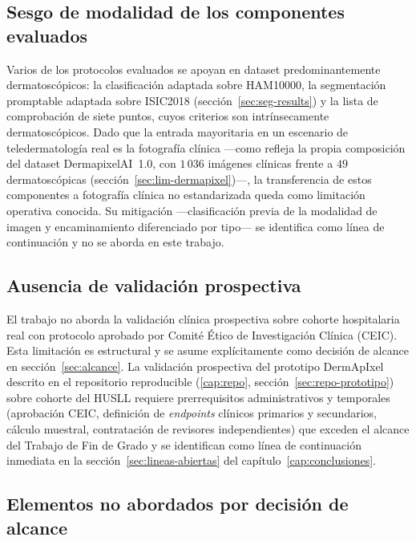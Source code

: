\subsection{Sesgo de modalidad de los componentes evaluados}
\label{sec:lim-modalidad-sistema}

Varios de los protocolos evaluados se apoyan en dataset
predominantemente dermatoscópicos: la clasificación adaptada sobre
HAM10000, la segmentación promptable adaptada sobre ISIC2018
(sección~\ref{sec:seg-results}) y la lista de comprobación de
siete puntos, cuyos criterios son intrínsecamente dermatoscópicos.
Dado que la entrada mayoritaria en un escenario de teledermatología
real es la fotografía clínica ---como refleja la propia composición
del dataset DermapixelAI~1.0, con $1\,036$ imágenes clínicas frente a
$49$ dermatoscópicas (sección~\ref{sec:lim-dermapixel})---, la
transferencia de estos componentes a fotografía clínica no
estandarizada queda como limitación operativa conocida. Su
mitigación ---clasificación previa de la modalidad de imagen y
encaminamiento diferenciado por tipo--- se identifica como línea de
continuación y no se aborda en este trabajo.

\subsection{Ausencia de validación prospectiva}
\label{sec:lim-prospectivo}

El trabajo no aborda la validación clínica prospectiva sobre
cohorte hospitalaria real con protocolo aprobado por Comité Ético
de Investigación Clínica (CEIC). Esta limitación es estructural y
se asume explícitamente como decisión de alcance en
sección~\ref{sec:alcance}. La validación prospectiva del prototipo
DermApIxel descrito en el repositorio reproducible (\ref{cap:repo}, sección~\ref{sec:repo-prototipo}) sobre cohorte del
HUSLL requiere prerrequisitos administrativos y temporales
(aprobación CEIC, definición de \emph{endpoints} clínicos
primarios y secundarios, cálculo muestral, contratación de
revisores independientes) que exceden el alcance del Trabajo de
Fin de Grado y se identifican como línea de continuación inmediata
en la sección~\ref{sec:lineas-abiertas} del capítulo~\ref{cap:conclusiones}.

\subsection{Elementos no abordados por decisión de alcance}
\label{sec:lim-fuera}
\label{sec:alcance}

